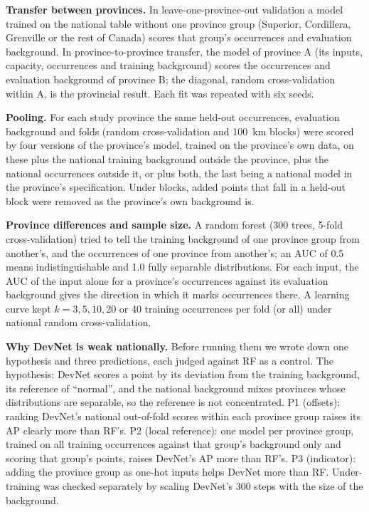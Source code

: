 \documentclass[pdflatex,sn-apa]{sn-jnl}
\begin{document}
\textbf{Transfer between provinces.} In leave-one-province-out validation a model trained on the national table without one province group (Superior, Cordillera, Grenville or the rest of Canada) scores that group's occurrences and evaluation background. In province-to-province transfer, the model of province A (its inputs, capacity, occurrences and training background) scores the occurrences and evaluation background of province B; the diagonal, random cross-validation within A, is the provincial result. Each fit was repeated with six seeds.

\textbf{Pooling.} For each study province the same held-out occurrences, evaluation background and folds (random cross-validation and 100~km blocks) were scored by four versions of the province's model, trained on the province's own data, on these plus the national training background outside the province, plus the national occurrences outside it, or plus both, the last being a national model in the province's specification. Under blocks, added points that fall in a held-out block were removed as the province's own background is.

\textbf{Province differences and sample size.} A random forest (300 trees, 5-fold cross-validation) tried to tell the training background of one province group from another's, and the occurrences of one province from another's; an AUC of 0.5 means indistinguishable and 1.0 fully separable distributions. For each input, the AUC of the input alone for a province's occurrences against its evaluation background gives the direction in which it marks occurrences there. A learning curve kept $k = 3, 5, 10, 20$ or 40 training occurrences per fold (or all) under national random cross-validation.

\textbf{Why DevNet is weak nationally.} Before running them we wrote down one hypothesis and three predictions, each judged against RF as a control. The hypothesis: DevNet scores a point by its deviation from the training background, its reference of ``normal'', and the national background mixes provinces whose distributions are separable, so the reference is not concentrated. P1 (offsets): ranking DevNet's national out-of-fold scores within each province group raises its AP clearly more than RF's. P2 (local reference): one model per province group, trained on all training occurrences against that group's background only and scoring that group's points, raises DevNet's AP more than RF's. P3 (indicator): adding the province group as one-hot inputs helps DevNet more than RF. Under-training was checked separately by scaling DevNet's 300 steps with the size of the background.
\end{document}
